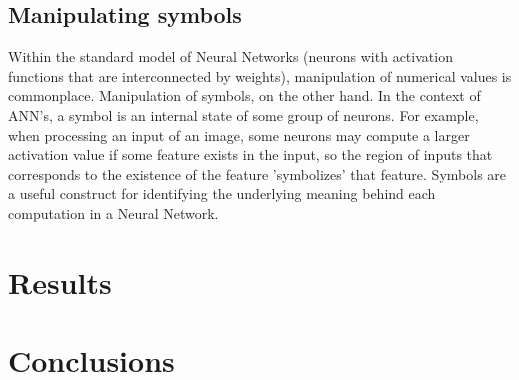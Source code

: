 \documentclass{article}
\begin{document}
	
	\subsection{Manipulating symbols}
	
		Within the standard model of Neural Networks (neurons with activation functions that are interconnected by weights), manipulation of numerical values is commonplace. Manipulation of symbols, on the other hand. In the context of ANN's, a symbol is an internal state of some group of neurons. For example, when processing an input of an image, some neurons may compute a larger activation value if some feature exists in the input, so the region of inputs that corresponds to the existence of the feature 'symbolizes' that feature. Symbols are a useful construct for identifying the underlying meaning behind each computation in a Neural Network.
		
	
	\section{Results}
	
	\section{Conclusions}
	
	
	
\end{document}

